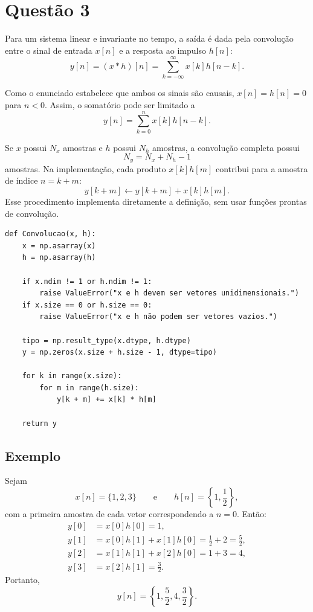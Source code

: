 \documentclass[12pt]{article}
\begin{document}
\section*{Questão 3}

Para um sistema linear e invariante no tempo, a saída é dada pela convolução
entre o sinal de entrada $x[n]$ e a resposta ao impulso $h[n]$:
\[
y[n]=(x*h)[n]=\sum_{k=-\infty}^{\infty}x[k]h[n-k].
\]

Como o enunciado estabelece que ambos os sinais são causais,
$x[n]=h[n]=0$ para $n<0$. Assim, o somatório pode ser limitado a
\[
y[n]=\sum_{k=0}^{n}x[k]h[n-k].
\]

Se $x$ possui $N_x$ amostras e $h$ possui $N_h$ amostras, a convolução completa
possui
\[
N_y=N_x+N_h-1
\]
amostras. Na implementação, cada produto $x[k]h[m]$ contribui para a amostra
de índice $n=k+m$:
\[
y[k+m]\leftarrow y[k+m]+x[k]h[m].
\]
Esse procedimento implementa diretamente a definição, sem usar funções prontas
de convolução.

\begin{verbatim}
def Convolucao(x, h):
    x = np.asarray(x)
    h = np.asarray(h)

    if x.ndim != 1 or h.ndim != 1:
        raise ValueError("x e h devem ser vetores unidimensionais.")
    if x.size == 0 or h.size == 0:
        raise ValueError("x e h não podem ser vetores vazios.")

    tipo = np.result_type(x.dtype, h.dtype)
    y = np.zeros(x.size + h.size - 1, dtype=tipo)

    for k in range(x.size):
        for m in range(h.size):
            y[k + m] += x[k] * h[m]

    return y
\end{verbatim}

\subsection*{Exemplo}

Sejam
\[
x[n]=\{1,2,3\}
\qquad\text{e}\qquad
h[n]=\left\{1,\frac{1}{2}\right\},
\]
com a primeira amostra de cada vetor correspondendo a $n=0$. Então:
\[
\begin{aligned}
y[0]&=x[0]h[0]=1,\\
y[1]&=x[0]h[1]+x[1]h[0]=\frac{1}{2}+2=\frac{5}{2},\\
y[2]&=x[1]h[1]+x[2]h[0]=1+3=4,\\
y[3]&=x[2]h[1]=\frac{3}{2}.
\end{aligned}
\]
Portanto,
\[
\boxed{y[n]=\left\{1,\frac{5}{2},4,\frac{3}{2}\right\}}.
\]
\end{document}
